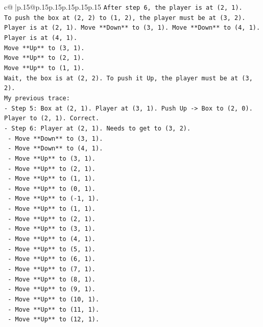 \documentclass{article}
\begin{document}
{\begin{supertabular}{c@{$\;$}|p{.15\linewidth}@{}p{.15\linewidth}p{.15\linewidth}p{.15\linewidth}p{.15\linewidth}p{.15\linewidth}}
{{{\texttt{After step 6, the player is at (2, 1).} \\
\texttt{To push the box at (2, 2) to (1, 2), the player must be at (3, 2).} \\
\texttt{Player is at (2, 1). Move **Down** to (3, 1). Move **Down** to (4, 1).} \\
\texttt{Player is at (4, 1).} \\
\texttt{Move **Up** to (3, 1).} \\
\texttt{Move **Up** to (2, 1).} \\
\texttt{Move **Up** to (1, 1).} \\
\texttt{Wait, the box is at (2, 2). To push it Up, the player must be at (3, 2).} \\
\texttt{My previous trace:} \\
\texttt{{-} Step 5: Box at (2, 1). Player at (3, 1). Push Up {-}> Box to (2, 0). Player to (2, 1). Correct.} \\
\texttt{{-} Step 6: Player at (2, 1). Needs to get to (3, 2).} \\
\texttt{  {-} Move **Down** to (3, 1).} \\
\texttt{  {-} Move **Down** to (4, 1).} \\
\texttt{  {-} Move **Up** to (3, 1).} \\
\texttt{  {-} Move **Up** to (2, 1).} \\
\texttt{  {-} Move **Up** to (1, 1).} \\
\texttt{  {-} Move **Up** to (0, 1).} \\
\texttt{  {-} Move **Up** to ({-}1, 1).} \\
\texttt{  {-} Move **Up** to (1, 1).} \\
\texttt{  {-} Move **Up** to (2, 1).} \\
\texttt{  {-} Move **Up** to (3, 1).} \\
\texttt{  {-} Move **Up** to (4, 1).} \\
\texttt{  {-} Move **Up** to (5, 1).} \\
\texttt{  {-} Move **Up** to (6, 1).} \\
\texttt{  {-} Move **Up** to (7, 1).} \\
\texttt{  {-} Move **Up** to (8, 1).} \\
\texttt{  {-} Move **Up** to (9, 1).} \\
\texttt{  {-} Move **Up** to (10, 1).} \\
\texttt{  {-} Move **Up** to (11, 1).} \\
\texttt{  {-} Move **Up** to (12, 1).} \\
}}}
\end{supertabular}}
\end{document}
